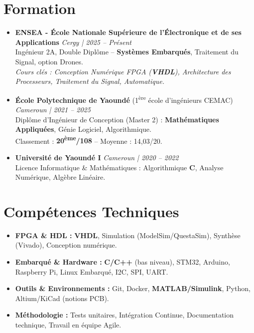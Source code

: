 \documentclass[a4paper,11pt]{article}
\begin{document}
\section{Formation}
\begin{itemize}[leftmargin=*, label=\tiny$\bullet$, nosep]
    \item \textbf{ENSEA - École Nationale Supérieure de l'Électronique et de ses Applications} \hfill \textit{Cergy | 2025 -- Présent} \\
    \small{Ingénieur 2A, Double Diplôme -- \textbf{Systèmes Embarqués}, Traitement du Signal, option Drones.} \\
    \textit{\small{Cours clés : Conception Numérique FPGA (\textbf{VHDL}), Architecture des Processeurs, Traitement du Signal, Automatique.}}
    \vspace{2pt}
    \item \textbf{École Polytechnique de Yaoundé} (1\textsuperscript{ère} école d'ingénieurs CEMAC) \hfill \textit{Cameroun | 2021 -- 2025} \\
    \small{Diplôme d'Ingénieur de Conception (Master 2) : \textbf{Mathématiques Appliquées}, Génie Logiciel, Algorithmique.} \\
    \small{Classement : \textbf{20\textsuperscript{ème}/108} -- Moyenne : 14,03/20.}
    \vspace{2pt}
    \item \textbf{Université de Yaoundé I} \hfill \textit{Cameroun | 2020 -- 2022} \\
    \small{Licence Informatique \& Mathématiques : Algorithmique \textbf{C}, Analyse Numérique, Algèbre Linéaire.}
\end{itemize}

\section{Compétences Techniques}
\begin{itemize}[leftmargin=*, nosep]
    \item \small{\textbf{FPGA \& HDL :} \textbf{VHDL}, Simulation (ModelSim/QuestaSim), Synthèse (Vivado), Conception numérique.}
    \item \small{\textbf{Embarqué \& Hardware :} \textbf{C/C++} (bas niveau), STM32, Arduino, Raspberry Pi, Linux Embarqué, I2C, SPI, UART.}
    \item \small{\textbf{Outils \& Environnements :} Git, Docker, \textbf{MATLAB/Simulink}, Python, Altium/KiCad (notions PCB).}
    \item \small{\textbf{Méthodologie :} Tests unitaires, Intégration Continue, Documentation technique, Travail en équipe Agile.}
\end{itemize}
\end{document}

